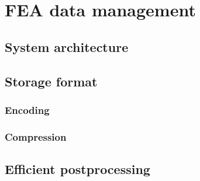 \chapter{FEA data management}
\label{chapter:data-management}


\section{System architecture}
\label{sec:system-architecture}


\section{Storage format}
\label{sec:storage-format}





\subsection {Encoding}

\subsection {Compression}

\section{Efficient postprocessing}
\label{sec:efficient-postprocessing}

